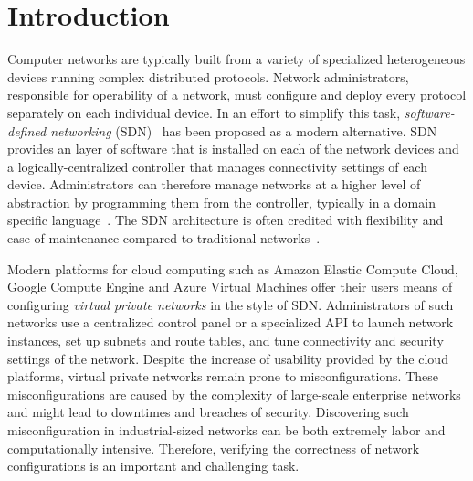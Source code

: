 \section{Introduction}
\label{sect:aws/introduction}
Computer networks are typically built from a variety of specialized heterogeneous devices running complex distributed 
protocols. Network administrators, responsible for operability of a network, must configure and deploy every protocol 
separately on each individual device. In an effort to simplify this task, \emph{software-defined networking} (SDN)~\cite{SDN} 
has been proposed as a modern alternative. SDN provides an layer of software that is installed on each of the network 
devices and a logically-centralized controller that manages connectivity settings of each device. Administrators can 
therefore manage networks at a higher level of abstraction by programming them from the controller, typically in a domain 
specific language~\cite{DBLP:journals/cm/FosterGRSFKMRRSWH13}. The SDN architecture is often credited with flexibility and ease 
of maintenance compared to traditional networks~\cite{benzekki2016software}.

Modern platforms for cloud computing such as Amazon Elastic Compute Cloud, Google Compute Engine and Azure Virtual Machines offer their users means of configuring \emph{virtual private networks} in the style of SDN. Administrators of such networks use a centralized control panel or a specialized API to launch network instances, set up subnets and route tables, and tune connectivity and security settings of the network. Despite the increase of usability provided by the cloud platforms, virtual private networks remain prone to misconfigurations. These 
misconfigurations are caused by the complexity of large-scale enterprise networks and might lead to downtimes and breaches of 
security. Discovering such misconfiguration in industrial-sized networks can be both extremely labor and computationally intensive. Therefore, 
verifying the correctness of network configurations is an important and challenging task.


